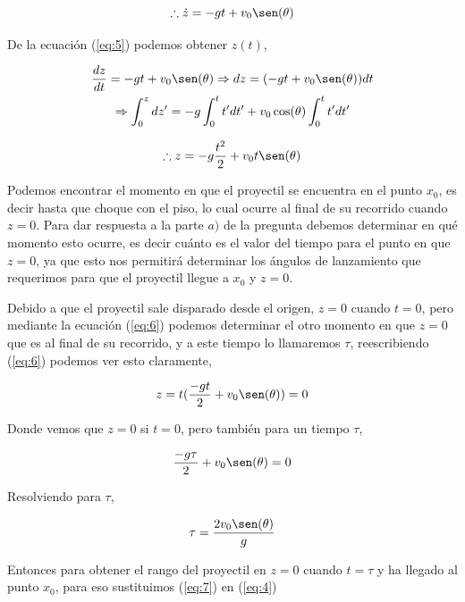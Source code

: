 \documentclass[a4paper,10pt]{article}
\numberwithin{equation}{section}
\begin{document}
\begin{equation}
 \therefore \dot{z} = -gt + v_0 \sen(\theta)
 \label{eq:5}
\end{equation}

De la ecuación (\ref{eq:5}) podemos obtener $z(t)$,

\begin{gather*}
 \frac{dz}{dt} = -gt + v_0 \sen(\theta) \Rightarrow dz = (-gt + v_0 \sen(\theta)) dt \\ \Rightarrow
 \int_0^z dz' = -g\int_0^t t' dt' + v_0 \cos(\theta) \int_0^t t'dt'
\end{gather*}

\begin{equation}
 \therefore z = - g \frac{t^2}{2} + v_0 t \sen(\theta)
 \label{eq:6}
\end{equation}

Podemos encontrar el momento en que el proyectil se encuentra en el punto $x_0$, 
es decir hasta que choque con el piso, lo cual ocurre al final de su recorrido cuando $z=0$.
Para dar respuesta a la parte $a)$ de la pregunta debemos determinar en qué momento
esto ocurre, es decir cuánto es el valor del tiempo para el punto en que 
$z=0$, ya que esto nos permitirá determinar los ángulos de lanzamiento
que requerimos para que el proyectil llegue a $x_0$ y $z=0$.

\vspace{.3cm}

Debido a que el proyectil sale disparado desde el origen, $z=0$ cuando
$t=0$, pero mediante la ecuación (\ref{eq:6}) podemos determinar el otro
momento en que $z=0$ que es al final de su recorrido, y a este tiempo
lo llamaremos $\tau$, reescribiendo (\ref{eq:6}) podemos ver esto claramente,

\begin{equation*}
 z = t(\frac{-gt}{2} + v_0 \sen(\theta)) = 0
\end{equation*}

Donde vemos que $z=0$ si $t=0$, pero también para un tiempo $\tau$,

\begin{equation*}
 \frac{-g\tau}{2} + v_0 \sen(\theta) = 0
\end{equation*}

Resolviendo para $\tau$,

\begin{equation}
 \tau = \frac{2v_0\sen(\theta)}{g}
 \label{eq:7}
\end{equation}

Entonces para obtener el rango del proyectil en $z=0$ cuando
$t=\tau$ y ha llegado al punto $x_0$, para eso sustituimos (\ref{eq:7}) en (\ref{eq:4})
\end{document}
